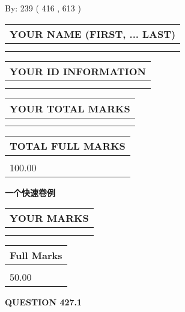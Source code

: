 \documentclass{ctexart}
\begin{document}
   
\hspace{1.0in} By: 
 239 ( 416 ,  613 )
   
   
   
   
\newpage 
\setcounter{page}{ 
   427001 } 
   
   
   
   
\noindent\begin{tabular}{|l|}
\hline
YOUR NAME (FIRST, ... LAST)  \\
\hline
 \\ 
 \\ 
\hline
\end{tabular}
\hspace{0.05in} \begin{tabular}{|l|}
\hline
 YOUR   ID   INFORMATION  \\
\hline
 \\ 
 \\ 
\hline
\end{tabular}
   
   
\vspace{0.2in}\noindent\begin{tabular}{|l|}
\hline
YOUR TOTAL MARKS  \\
\hline
 \\ 
 \\ 
\hline
\end{tabular}
\hspace{0.05in} \begin{tabular}{|l|}
\hline
TOTAL FULL MARKS  \\
\hline
 \\ 
100.00 \\
\hline
\end{tabular}
   
   
 \vspace{0.2in}
{\LARGE {\textbf{ 一个快速卷例}}}
   
   
  
\vspace{0.2in}
  
\noindent\begin{tabular}{|l|}
\hline
 YOUR MARKS  \\
\hline
 \\ 
 \\ 
\hline
\end{tabular}
\hspace{0.05in} \begin{tabular}{|l|}
\hline
 Full Marks  \\
\hline
 \\ 
50.00 \\
\hline
\end{tabular}
{\textbf{\Large{QUESTION
427.1 
}}}
  
\end{document}
